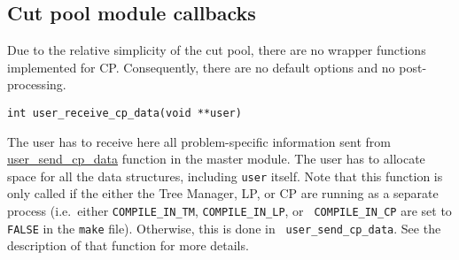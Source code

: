 
\subsection{Cut pool module callbacks}

Due to the relative simplicity of the cut pool, there are no wrapper
functions implemented for CP. Consequently, there are no default
options and no post-processing.

\bd


\label{user_receive_cp_data}
\begin{verbatim}
int user_receive_cp_data(void **user)
\end{verbatim}

\bd

\item[Description:] \hfill

The user has to receive here all problem-specific information sent
from \hyperref{{\tt user\_send\_cp\_data()}}{\ptt{user\_send\_cp\_data()}
(see Section }{)}{user_send_cp_data} function in the master module.
The user has to allocate space for all the data structures, including
{\tt user} itself. Note that this function is only called if the
either the Tree Manager, LP, or CP are running as a separate process
(i.e.~either {\tt COMPILE\_IN\_TM}, {\tt COMPILE\_IN\_LP}, or {\tt
COMPILE\_IN\_CP} are set to {\tt FALSE} in the {\tt make} file).
Otherwise, this is done in {\tt {}
{user_send_cp_data}}. See the
description of that function for more details.

